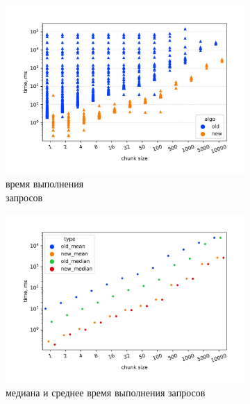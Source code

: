 \documentclass[14pt]{matmex-diploma-custom}
\theoremstyle{definition}
\begin{document}
    \begin{figure}[H]
    \begin{subfigure}[b]{0.5\textwidth}
    \centering
    \includegraphics[width=\textwidth]{pics/subclass_old_new.pdf_1.jpg} \caption{время выполнения \\ запросов}
    \label{fig:subim1}
    \end{subfigure}%
    \begin{subfigure}[b]{0.5\textwidth}
    \centering
    \includegraphics[width=\columnwidth]{pics/subclass_old_new_mean&median.pdf_1.jpg} \caption{медиана и среднее время выполнения запросов}
    \label{fig:subim2}
    \end{subfigure} \caption{Грамматика $G_2$ на Enzyme}
    \label{old_new2}
        \begin{subfigure}[b]{0.5\textwidth}

\end{subfigure}
\end{figure}
\end{document}
